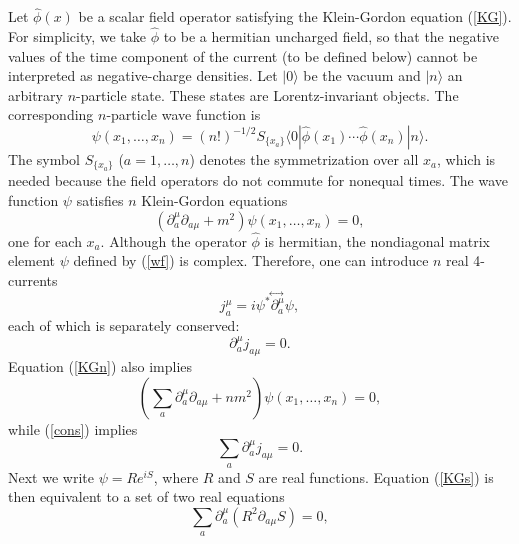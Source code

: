 \documentclass[11pt]{article}
\begin{document}
Let $\hat{\phi}(x)$ be a scalar field operator satisfying 
the Klein-Gordon equation (\ref{KG}).
For simplicity, we take $\hat{\phi}$ to be a hermitian uncharged field, 
so that 
the negative values of the time component of the current (to be defined
below) 
cannot be interpreted as negative-charge densities.
Let $|0\rangle$ be the vacuum and $|n\rangle$ an arbitrary 
$n$-particle state. These states are Lorentz-invariant objects.
The corresponding $n$-particle wave function is \cite{schweber,nikoldbb1}
\begin{equation}\label{wf}
\psi(x_1,\ldots ,x_n)=(n!)^{-1/2}S_{\{ x_a\} }
\langle 0|\hat{\phi}(x_1)\cdots\hat{\phi}(x_n)|n\rangle .
\end{equation}
The symbol $S_{\{ x_a\} }$ ($a=1,\ldots ,n$) 
denotes the symmetrization over all $x_a$, 
which is needed because the field operators do not commute 
for nonequal times.
The wave function $\psi$ satisfies $n$ Klein-Gordon equations
\begin{equation}\label{KGn}
(\partial_a^{\mu}\partial_{a\mu}+m^2)\psi(x_1,\ldots ,x_n)=0 ,
\end{equation}
one for each $x_a$.
Although the operator $\hat{\phi}$ is hermitian, the nondiagonal
matrix element $\psi$ defined by (\ref{wf}) is complex.
Therefore,
one can introduce $n$ real 4-currents
\begin{equation}\label{curn}
j^{\mu}_a=i\psi^* \!\stackrel{\leftrightarrow\;}{\partial^{\mu}_a}\! \psi ,
\end{equation}
each of which is separately conserved:
\begin{equation}\label{cons}
\partial^{\mu}_a j_{a\mu}=0.
\end{equation}
Equation (\ref{KGn}) also implies  
\begin{equation}\label{KGs}
\left( \sum_a\partial_a^{\mu}\partial_{a\mu}+nm^2 \right)
\psi(x_1,\ldots ,x_n)=0 ,
\end{equation}
while (\ref{cons}) implies
\begin{equation}\label{conss}
\sum_a\partial^{\mu}_a j_{a\mu}=0.
\end{equation}
Next we write $\psi=Re^{iS}$, where $R$ and $S$ are real
functions. Equation (\ref{KGs}) 
is then equivalent to a set of two real equations
\begin{equation}\label{cont}
\sum_a\partial_a^{\mu}(R^2\partial_{a\mu}S)=0,
\end{equation}
\end{document}
